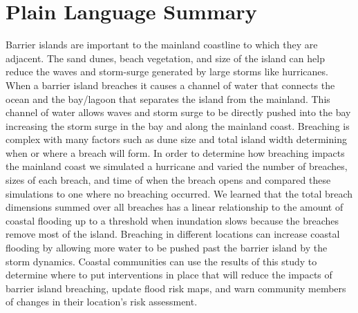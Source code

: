 \documentclass{coastal_paper}
\begin{document}
\section*{Plain Language Summary}
Barrier islands are important to the mainland coastline to which they are adjacent. The sand dunes, beach vegetation, and size of the island can help reduce the waves and storm-surge generated by large storms like hurricanes. When a barrier island breaches it causes a channel of water that connects the ocean and the bay/lagoon that separates the island from the mainland. This channel of water allows waves and storm surge to be directly pushed into the bay increasing the storm surge in the bay and along the mainland coast. Breaching is complex with many factors such as dune size and total island width determining when or where a breach will form. In order to determine how breaching impacts the mainland coast we simulated a hurricane and varied the number of breaches, sizes of each breach, and time of when the breach opens and compared these simulations to one where no breaching occurred. We learned that the total breach dimensions summed over all breaches has a linear relationship to the amount of coastal flooding up to a threshold when inundation slows because the breaches remove most of the island. Breaching in different locations can increase coastal flooding by allowing more water to be pushed past the barrier island by the storm dynamics. Coastal communities can use the results of this study to determine where to put interventions in place that will reduce the impacts of barrier island breaching, update flood risk maps, and warn community members of changes in their location's risk assessment.

\newpage

\linenumbers
\end{document}
